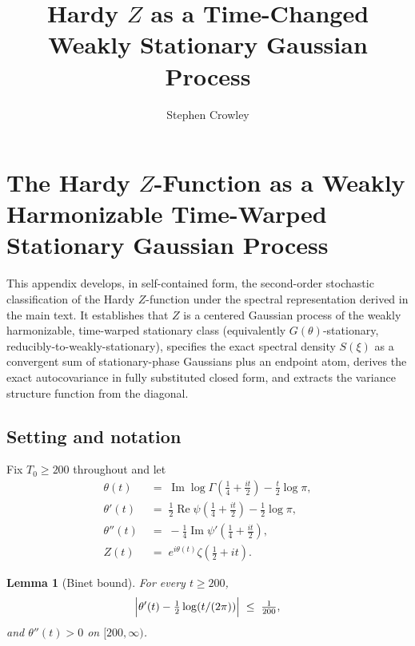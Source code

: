 \documentclass[11pt]{amsart}
\title{Hardy $Z$ as a Time-Changed Weakly Stationary Gaussian Process}
\author{Stephen Crowley}
\date{}
\newtheorem{lemma}[theorem]{Lemma}
\theoremstyle{definition}
\DeclareMathOperator{\ImOp}{Im}
\DeclareMathOperator{\ReOp}{Re}
\let\Im\ImOp
\let\Re\ReOp
\begin{document}
\maketitle

\appendix

\section{The Hardy \texorpdfstring{$Z$}{Z}-Function as a Weakly Harmonizable Time-Warped Stationary Gaussian Process}
\label{app:warped}

This appendix develops, in self-contained form, the second-order stochastic
classification of the Hardy $Z$-function under the spectral representation
derived in the main text. It establishes that $Z$ is a centered Gaussian
process of the weakly harmonizable, time-warped stationary class
(equivalently $G(\theta)$-stationary, reducibly-to-weakly-stationary),
specifies the exact spectral density $S(\xi)$ as a convergent sum of
stationary-phase Gaussians plus an endpoint atom, derives the exact
autocovariance in fully substituted closed form, and extracts the variance
structure function from the diagonal.

\subsection{Setting and notation}
\label{sub:setting}

Fix $T_{0}\ge 200$ throughout and let
\begin{align}
\theta(t) &\;=\; \Im\log\Gamma\!\left(\tfrac{1}{4}+\tfrac{it}{2}\right)-\tfrac{t}{2}\log\pi, \label{eq:theta}\\
\theta'(t) &\;=\; \tfrac{1}{2}\Re\psi\!\left(\tfrac{1}{4}+\tfrac{it}{2}\right)-\tfrac{1}{2}\log\pi, \label{eq:thetap}\\
\theta''(t) &\;=\; -\tfrac{1}{4}\Im\psi'\!\left(\tfrac{1}{4}+\tfrac{it}{2}\right),\label{eq:thetapp}\\
Z(t) &\;=\; e^{i\theta(t)}\zeta\!\left(\tfrac{1}{2}+it\right).\label{eq:Zdef}
\end{align}

\begin{lemma}[Binet bound]\label{lem:binet}
For every $t\ge 200$,
\begin{equation}\label{eq:binet}
\Bigl|\theta'(t)-\tfrac{1}{2}\log(t/(2\pi))\Bigr|\;\le\;\tfrac{1}{200},
\end{equation}
and $\theta''(t)>0$ on $[200,\infty)$.
\end{lemma}
\end{document}
